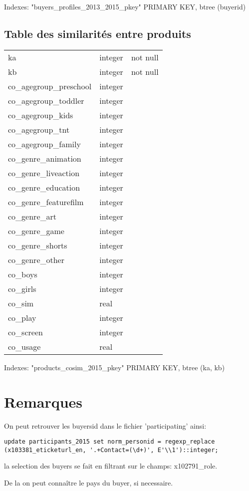 \documentclass[a4paper,11pt]{article}
\begin{document}
Indexes:
    "buyers\_profiles\_2013\_2015\_pkey" PRIMARY KEY, btree (buyerid)

\subsection{Table des similarités entre produits}

\begin{tabular}{lll}
 ka                    & integer & not null \\
 kb                    & integer & not null \\
 co\_agegroup\_preschool & integer & \\
 co\_agegroup\_toddler   & integer & \\
 co\_agegroup\_kids      & integer & \\
 co\_agegroup\_tnt       & integer & \\
 co\_agegroup\_family    & integer & \\
 co\_genre\_animation    & integer & \\
 co\_genre\_liveaction   & integer & \\
 co\_genre\_education    & integer & \\
 co\_genre\_featurefilm  & integer & \\
 co\_genre\_art          & integer & \\
 co\_genre\_game         & integer & \\
 co\_genre\_shorts       & integer & \\
 co\_genre\_other        & integer & \\
 co\_boys               & integer & \\
 co\_girls              & integer & \\
 co\_sim                & real    & \\
 co\_play               & integer & \\
 co\_screen             & integer & \\
 co\_usage              & real    &
\end{tabular}

Indexes:
    "products\_cosim\_2015\_pkey" PRIMARY KEY, btree (ka, kb)

\section{Remarques}

On peut retrouver les buyersid dans le fichier 'participating' ainsi:

\begin{verbatim}
update participants_2015 set norm_personid = regexp_replace (x103381_eticketurl_en, '.+Contact=(\d+)', E'\\1')::integer;
\end{verbatim}

la selection des buyers se fait en filtrant sur le champs: x102791\_role.

De la on peut connaître le pays du buyer, si necessaire.
\end{document}
